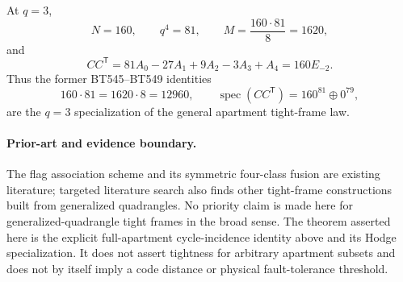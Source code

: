 At \(q=3\),
\[
N=160,\qquad q^4=81,\qquad M=\frac{160\cdot81}{8}=1620,
\]
and
\[
\boxed{
CC^{\mathsf T}
=81A_0-27A_1+9A_2-3A_3+A_4
=160E_{-2}.
}
\]
Thus the former BT545--BT549 identities
\[
160\cdot81=1620\cdot8=12960,
\qquad
\operatorname{spec}(CC^{\mathsf T})=160^{81}\oplus0^{79},
\]
are the \(q=3\) specialization of the general apartment tight-frame law.

\paragraph{Prior-art and evidence boundary.}
The flag association scheme and its symmetric four-class fusion are existing literature;
targeted literature search also finds other tight-frame constructions built from generalized
quadrangles.  No priority claim is made here for generalized-quadrangle tight frames in the
broad sense.  The theorem asserted here is the explicit full-apartment cycle-incidence identity
above and its Hodge specialization.  It does not assert tightness for arbitrary apartment
subsets and does not by itself imply a code distance or physical fault-tolerance threshold.
